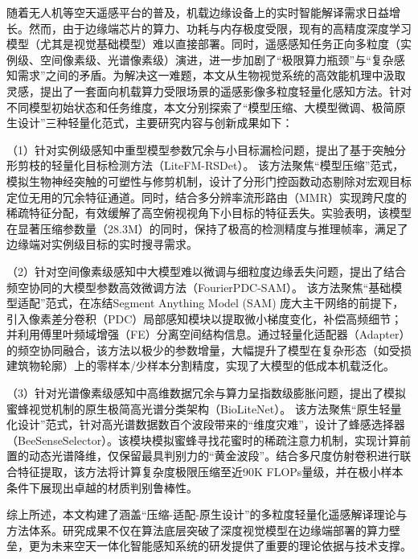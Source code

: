 \begin{cabstract}
随着无人机等空天遥感平台的普及，机载边缘设备上的实时智能解译需求日益增长。然而，由于边缘端芯片的算力、功耗与内存极度受限，现有的高精度深度学习模型（尤其是视觉基础模型）难以直接部署。同时，遥感感知任务正向多粒度（实例级、空间像素级、光谱像素级）演进，进一步加剧了“极限算力瓶颈”与“复杂感知需求”之间的矛盾。为解决这一难题，本文从生物视觉系统的高效能机理中汲取灵感，提出了一套面向机载算力受限场景的遥感影像多粒度轻量化感知方法。针对不同模型初始状态和任务维度，本文分别探索了“模型压缩、大模型微调、极简原生设计”三种轻量化范式，主要研究内容与创新成果如下：

（1）针对实例级感知中重型模型参数冗余与小目标漏检问题，提出了基于突触分形剪枝的轻量化目标检测方法（LiteFM-RSDet）。 该方法聚焦“模型压缩”范式，模拟生物神经突触的可塑性与修剪机制，设计了分形门控函数动态剔除对宏观目标定位无用的冗余特征通道。同时，结合多分辨率流形路由（MMR）实现跨尺度的稀疏特征分配，有效缓解了高空俯视视角下小目标的特征丢失。实验表明，该模型在显著压缩参数量（28.3M）的同时，保持了极高的检测精度与推理帧率，满足了边缘端对实例级目标的实时搜寻需求。

（2）针对空间像素级感知中大模型难以微调与细粒度边缘丢失问题，提出了结合频空协同的大模型参数高效微调方法（FourierPDC-SAM）。 该方法聚焦“基础模型适配”范式，在冻结Segment Anything Model (SAM) 庞大主干网络的前提下，引入像素差分卷积（PDC）局部感知模块以提取微小梯度变化，补偿高频细节；并利用傅里叶频域增强（FE）分离空间结构信息。通过轻量化适配器（Adapter）的频空协同融合，该方法以极少的参数增量，大幅提升了模型在复杂形态（如受损建筑物轮廓）上的零样本/少样本分割精度，实现了大模型的低成本机载泛化。

（3）针对光谱像素级感知中高维数据冗余与算力呈指数级膨胀问题，提出了模拟蜜蜂视觉机制的原生极简高光谱分类架构（BioLiteNet）。 该方法聚焦“原生轻量化设计”范式，针对高光谱数据数百个波段带来的“维度灾难”，设计了蜂感选择器（BeeSenseSelector）。该模块模拟蜜蜂寻找花蜜时的稀疏注意力机制，实现计算前置的动态光谱降维，仅保留最具判别力的“黄金波段”。结合多尺度仿射卷积进行联合特征提取，该方法将计算复杂度极限压缩至近90K FLOPs量级，并在极小样本条件下展现出卓越的材质判别鲁棒性。

综上所述，本文构建了涵盖“压缩-适配-原生设计”的多粒度轻量化遥感解译理论与方法体系。研究成果不仅在算法底层突破了深度视觉模型在边缘端部署的算力壁垒，更为未来空天一体化智能感知系统的研发提供了重要的理论依据与技术支撑。
\end{cabstract}

